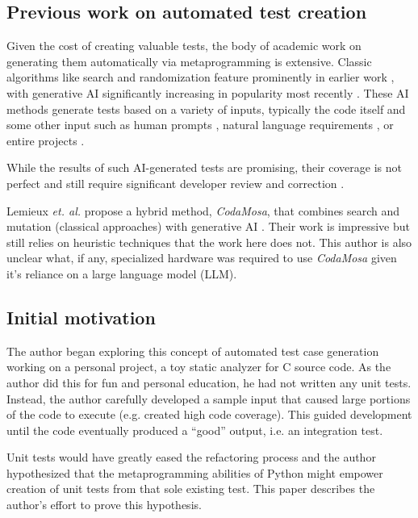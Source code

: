 \subsection{Previous work on automated test creation}\label{sec:intro-3}

Given the cost of creating valuable tests,
the body of academic work on generating them automatically 
via metaprogramming is extensive. Classic algorithms like search 
and randomization feature prominently in earlier work 
\cite{Luk22Pynguin0170}, with generative AI significantly increasing in 
popularity most recently
\cite{bhatia2023unit,takerngsaksiri2024tdd,wang2024software, kahur2023java}.
%
These AI methods generate tests based on a variety of inputs, typically the code
itself and some other input such as human prompts 
\cite{lahiri2023interactivecodegenerationtestdriven},
natural language requirements \cite{wang2024software}, or entire projects
\cite{rao2023cat}.  

While the results of such AI-generated tests are promising,
their coverage is not perfect \cite{kahur2023java} and still require significant
developer review and correction \cite{sundqvist2024ai}.  

Lemieux \textit{et. al.} propose a hybrid method, \textit{CodaMosa}, that 
combines search and mutation (classical approaches) with generative AI
\cite{lemieux2023codamosa}.  Their work is impressive but still relies on 
heuristic techniques that the work here does not. This author is also unclear 
what, if any, specialized hardware was required to use \textit{CodaMosa} given
it's reliance on a large language model (LLM).

\subsection{Initial motivation}\label{sec:intro-4}

The author began exploring this concept of automated test case generation
working on a personal project, a toy static analyzer for C source code.  As the
author did this for fun and personal education, he had not written any unit
tests.  Instead, the author carefully developed a sample input that caused large
portions of the code to execute (e.g. created high code coverage).  This guided
development until the code eventually produced a “good” output, i.e. an integration
test.
  
Unit tests would have greatly eased the refactoring process and the author 
hypothesized that the metaprogramming abilities of Python might empower creation
of unit tests from that sole existing test. This paper describes the author's
effort to prove this hypothesis.

